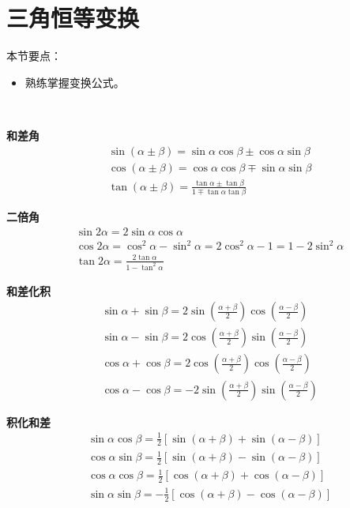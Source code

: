 \section{三角恒等变换}

本节要点：
\begin{itemize}
    \item 熟练掌握变换公式。
\end{itemize}

~

{\bf 和差角}
\begin{align*}
&\sin \left( \alpha \pm \beta \right) =\sin \alpha \cos \beta \pm \cos \alpha \sin \beta \\
&\cos \left( \alpha \pm \beta \right) =\cos \alpha \cos \beta \mp \sin \alpha \sin \beta \\
&\tan \left( \alpha \pm \beta \right) =\frac{\tan \alpha \pm \tan \beta}{1\mp \tan \alpha \tan \beta}
\end{align*}

{\bf 二倍角}
\begin{align*}
&\sin 2\alpha =2\sin \alpha \cos \alpha \\
&\cos 2\alpha =\cos ^2\alpha -\sin ^2\alpha =2\cos ^2\alpha -1=1-2\sin ^2\alpha \\
&\tan 2\alpha =\frac{2\tan \alpha}{1-\tan ^2\alpha}
\end{align*}

{\bf 和差化积}
\begin{align*}
&\sin \alpha +\sin \beta =2\sin \left( \frac{\alpha +\beta}{2} \right) \cos \left( \frac{\alpha -\beta}{2} \right) \\
&\sin \alpha -\sin \beta =2\cos \left( \frac{\alpha +\beta}{2} \right) \sin \left( \frac{\alpha -\beta}{2} \right) \\
&\cos \alpha +\cos \beta =2\cos \left( \frac{\alpha +\beta}{2} \right) \cos \left( \frac{\alpha -\beta}{2} \right) \\
&\cos \alpha -\cos \beta =-2\sin \left( \frac{\alpha +\beta}{2} \right) \sin \left( \frac{\alpha -\beta}{2} \right)
\end{align*}

{\bf 积化和差}
\begin{align*}
&\sin \alpha \cos \beta =\frac{1}{2}\left[ \sin \left( \alpha +\beta \right) +\sin \left( \alpha -\beta \right) \right] \\
&\cos \alpha \sin \beta =\frac{1}{2}\left[ \sin \left( \alpha +\beta \right) -\sin \left( \alpha -\beta \right) \right] \\
&\cos \alpha \cos \beta =\frac{1}{2}\left[ \cos \left( \alpha +\beta \right) +\cos \left( \alpha -\beta \right) \right] \\
&\sin \alpha \sin \beta =-\frac{1}{2}\left[ \cos \left( \alpha +\beta \right) -\cos \left( \alpha -\beta \right) \right]
\end{align*}




